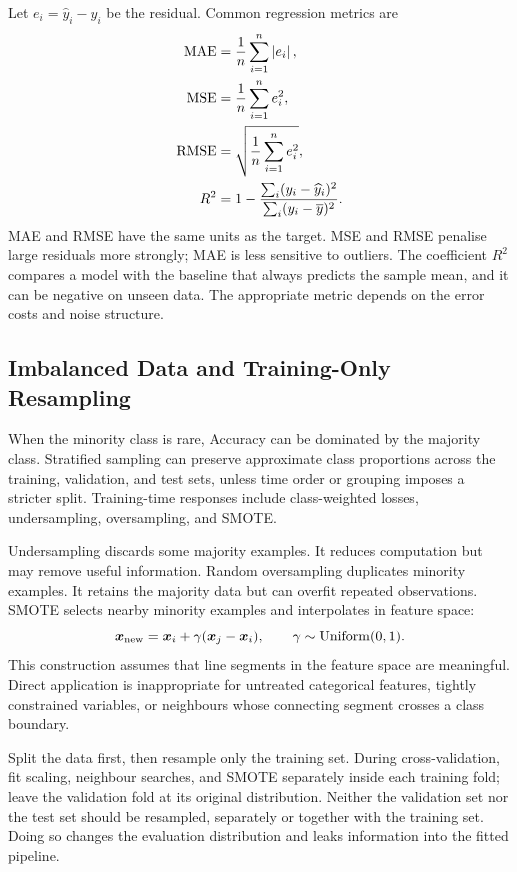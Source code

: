 Let $e_i=\widehat y_i-y_i$ be the residual. Common regression metrics are
\begin{align*}
  \mathrm{MAE}
  &=\frac1n\sum_{i=1}^{n}\left\lvert e_i\right\rvert,\\
  \mathrm{MSE}
  &=\frac1n\sum_{i=1}^{n}e_i^2,\\
  \mathrm{RMSE}
  &=\sqrt{\frac1n\sum_{i=1}^{n}e_i^2},\\
  R^2
  &=1-\frac{\sum_i(y_i-\widehat y_i)^2}
          {\sum_i(y_i-\overline y)^2}.
\end{align*}
MAE and RMSE have the same units as the target. MSE and RMSE penalise large residuals more strongly; MAE is less sensitive to outliers. The coefficient $R^2$ compares a model with the baseline that always predicts the sample mean, and it can be negative on unseen data. The appropriate metric depends on the error costs and noise structure.

\subsection{Imbalanced Data and Training-Only Resampling}

When the minority class is rare, Accuracy can be dominated by the majority class. Stratified sampling can preserve approximate class proportions across the training, validation, and test sets, unless time order or grouping imposes a stricter split. Training-time responses include class-weighted losses, undersampling, oversampling, and SMOTE.

Undersampling discards some majority examples. It reduces computation but may remove useful information. Random oversampling duplicates minority examples. It retains the majority data but can overfit repeated observations. SMOTE selects nearby minority examples and interpolates in feature space:
\[
  \bm{x}_{\mathrm{new}}
  =\bm{x}_i+\gamma(\bm{x}_j-\bm{x}_i),
  \qquad
  \gamma\sim\mathrm{Uniform}(0,1).
\]
This construction assumes that line segments in the feature space are meaningful. Direct application is inappropriate for untreated categorical features, tightly constrained variables, or neighbours whose connecting segment crosses a class boundary.

\begin{correction}
Split the data first, then resample only the training set. During cross-validation, fit scaling, neighbour searches, and SMOTE separately inside each training fold; leave the validation fold at its original distribution. Neither the validation set nor the test set should be resampled, separately or together with the training set. Doing so changes the evaluation distribution and leaks information into the fitted pipeline.
\end{correction}

